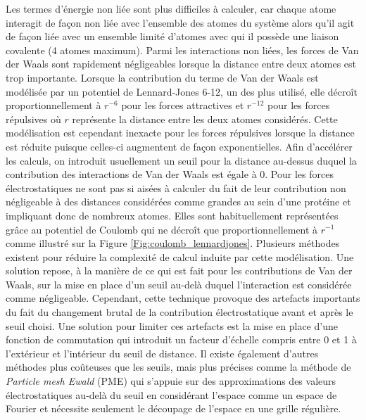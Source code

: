 Les termes d'énergie non liée sont plus difficiles à calculer, car chaque atome interagit de façon non liée avec l'ensemble des atomes du système alors qu'il agit de façon liée avec un ensemble limité d'atomes avec qui il possède une liaison covalente (4 atomes maximum). 
Parmi les interactions non liées, les forces de Van der Waals sont rapidement négligeables lorsque la distance entre deux atomes est trop importante. Lorsque la contribution du terme de Van der Waals est modélisée par un potentiel de Lennard-Jones 6-12, un des plus utilisé, elle décroît proportionnellement à $r^{-6}$ pour les forces attractives et $r^{-12}$ pour les forces répulsives où $r$ représente la distance entre les deux atomes considérés. Cette modélisation est cependant inexacte pour les forces répulsives lorsque la distance est réduite puisque celles-ci augmentent de façon exponentielles. Afin d'accélérer les calculs, on introduit usuellement un seuil pour la distance au-dessus duquel la contribution des interactions de Van der Waals est égale à 0.
Pour les forces électrostatiques ne sont pas si aisées à calculer du fait de leur contribution non négligeable à des distances considérées comme grandes au sein d'une protéine et impliquant donc de nombreux atomes. Elles sont habituellement représentées grâce au potentiel de Coulomb qui ne décroît que proportionnellement à $r^{-1}$ comme illustré sur la Figure \ref{Fig:coulomb_lennardjones}. Plusieurs méthodes existent pour réduire la complexité de calcul induite par cette modélisation. Une solution repose, à la manière de ce qui est fait pour les contributions de Van der Waals, sur la mise en place d'un seuil au-delà duquel l'interaction est considérée comme négligeable. Cependant, cette technique provoque des artefacts importants du fait du changement brutal de la contribution électrostatique avant et après le seuil choisi. Une solution pour limiter ces artefacts est la mise en place d'une fonction de commutation qui introduit un facteur d'échelle compris entre 0 et 1 à l'extérieur et l'intérieur du seuil de distance. Il existe également d'autres méthodes plus coûteuses que les seuils, mais plus précises comme la méthode de \textit{Particle mesh Ewald} (PME) qui s'appuie sur des approximations des valeurs électrostatiques au-delà du seuil en considérant l'espace comme un espace de Fourier et nécessite seulement le découpage de l'espace en une grille régulière.

